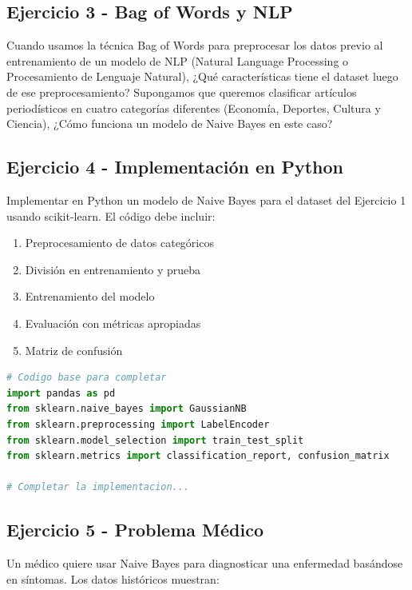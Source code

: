 \documentclass[12pt]{article}
\begin{document}
\subsection{Ejercicio 3 - Bag of Words y NLP}

Cuando usamos la técnica Bag of Words para preprocesar los datos previo al entrenamiento de un modelo de NLP (Natural Language Processing o Procesamiento de Lenguaje Natural), ¿Qué características tiene el dataset luego de ese preprocesamiento? Supongamos que queremos clasificar artículos periodísticos en cuatro categorías diferentes (Economía, Deportes, Cultura y Ciencia), ¿Cómo funciona un modelo de Naive Bayes en este caso?

\subsection{Ejercicio 4 - Implementación en Python}

Implementar en Python un modelo de Naive Bayes para el dataset del Ejercicio 1 usando scikit-learn. El código debe incluir:

\begin{enumerate}
    \item[a.] Preprocesamiento de datos categóricos
    \item[b.] División en entrenamiento y prueba
    \item[c.] Entrenamiento del modelo
    \item[d.] Evaluación con métricas apropiadas
    \item[e.] Matriz de confusión
\end{enumerate}

\begin{lstlisting}[language=Python]
# Codigo base para completar
import pandas as pd
from sklearn.naive_bayes import GaussianNB
from sklearn.preprocessing import LabelEncoder
from sklearn.model_selection import train_test_split
from sklearn.metrics import classification_report, confusion_matrix

# Completar la implementacion...
\end{lstlisting}

\subsection{Ejercicio 5 - Problema Médico}

Un médico quiere usar Naive Bayes para diagnosticar una enfermedad basándose en síntomas. Los datos históricos muestran:
\end{document}
